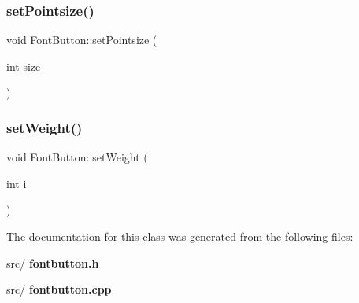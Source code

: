 \mbox{\label{class_font_button_a48dbf1925eee429d0e1bba06bf8b6059}} 
\subsubsection{set\+Pointsize()}
{\footnotesize\ttfamily void Font\+Button\+::set\+Pointsize (\begin{DoxyParamCaption}\item[{int}]{size }\end{DoxyParamCaption})}

\mbox{\label{class_font_button_a6443f5ae1b225d31727619bdacede476}} 
\subsubsection{set\+Weight()}
{\footnotesize\ttfamily void Font\+Button\+::set\+Weight (\begin{DoxyParamCaption}\item[{int}]{i }\end{DoxyParamCaption})}



The documentation for this class was generated from the following files\+:\begin{DoxyCompactItemize}
\item 
src/\textbf{ fontbutton.\+h}\item 
src/\textbf{ fontbutton.\+cpp}\end{DoxyCompactItemize}
